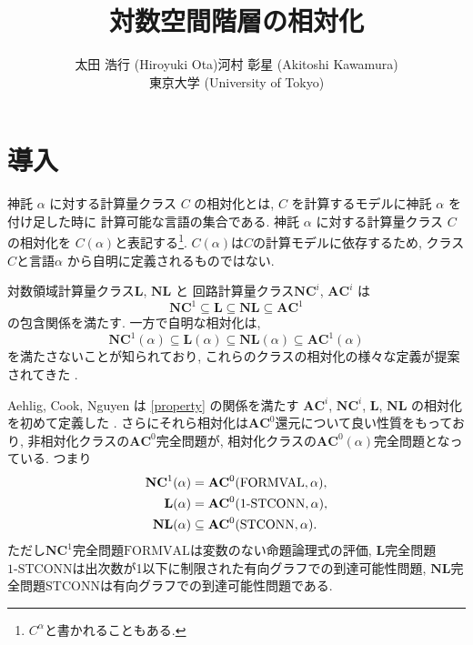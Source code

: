 \documentclass[11pt,a4paper]{jsarticle}
\title{対数空間階層の相対化}
\author{太田 浩行 (Hiroyuki Ota)\qquad 河村 彰星 (Akitoshi Kawamura)
\\ 東京大学 (University of Tokyo)}
\date{}
\theoremstyle{definition}
\theoremstyle{remark}
\newcommand{\classfont}{\mathbf}
\newcommand{\AC}{\classfont{AC}}
\newcommand{\NC}{\classfont{NC}}
\renewcommand{\L}{\classfont{L}}
\newcommand{\NL}{\classfont{NL}}
\newcommand{\probfont}{\text}
\newcommand{\oneSTCONN}{\probfont{1-STCONN}}
\newcommand{\STCONN}{\probfont{STCONN}}
\newcommand{\FORMVAL}{\probfont{FORMVAL}}
\begin{document}
\maketitle



\section{導入}
神託 $\alpha$ に対する計算量クラス $C$ の相対化とは,
$C$ を計算するモデルに神託 $\alpha$ を付け足した時に
計算可能な言語の集合である.
神託 $\alpha$ に対する計算量クラス $C$ の相対化を
$C(\alpha)$と表記する\footnote{$C^\alpha$と書かれることもある.}.
$C(\alpha)$は$C$の計算モデルに依存するため, クラス$C$と言語$\alpha$
から自明に定義されるものではない.

対数領域計算量クラス$\L$, $\NL$ と
回路計算量クラス$\NC^i$, $\AC^i$ は
\begin{equation*}
 \NC^1 \subseteq \L \subseteq \NL \subseteq \AC^1
\end{equation*}
の包含関係を満たす.
一方で自明な相対化は,
\begin{equation}
 \NC^1(\alpha) \subseteq \L(\alpha) \subseteq \NL(\alpha) \subseteq \AC^1(\alpha) \label{property}
\end{equation}
を満たさないことが知られており,
これらのクラスの相対化の様々な定義が提案されてきた
\cite{aehlig2007relativizing,buss1988relativized,ladner1976relativization,wilson1988measure}.


Aehlig, Cook, Nguyen は \eqref{property} の関係を満たす
$\AC^i$, $\NC^i$, $\L$, $\NL$ の相対化を初めて定義した
\cite{aehlig2007relativizing}.
さらにそれら相対化は$\AC^0$還元について良い性質をもっており,
非相対化クラスの$\AC^0$完全問題が,
相対化クラスの$\AC^0(\alpha)$完全問題となっている. つまり
\begin{align}
 \NC^1(\alpha) &= \AC^0 (\FORMVAL, \alpha), \notag
 \\
 \L(\alpha) &= \AC^0 (\oneSTCONN, \alpha), \label{eq:nl-in-ac0-stconn}
 \\
 \NL(\alpha) &\subseteq \AC^0(\STCONN, \alpha). \notag
\end{align}
ただし$\NC^1$完全問題$\FORMVAL$は変数のない命題論理式の評価,
$\L$完全問題$\oneSTCONN$は出次数が1以下に制限された有向グラフでの到達可能性問題,
$\NL$完全問題$\STCONN$は有向グラフでの到達可能性問題である.
\end{document}
